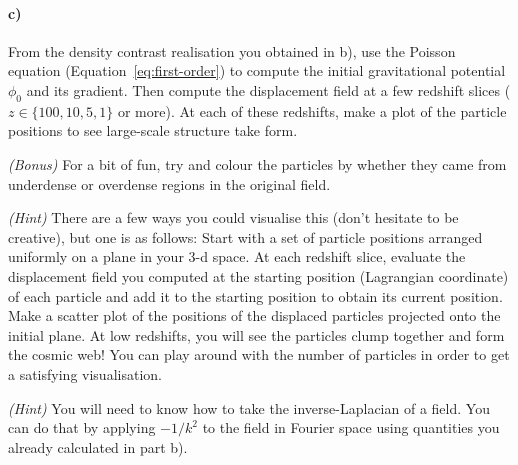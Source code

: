\documentclass[12pt]{article}
\begin{document}
\paragraph{c)} From the density contrast realisation you obtained in b), use the
Poisson equation (Equation~\ref{eq:first-order}) to compute the initial
gravitational potential $\phi_0$ and its gradient. Then compute the
displacement field at a few redshift slices ($z \in \{100, 10, 5, 1\}$ or more).
At each of these redshifts, make a plot of the particle positions to see
large-scale structure take form.

\emph{(Bonus)} For a bit of fun, try and colour the particles by whether they came from underdense or overdense regions in the original field.

\emph{(Hint)} There are a few ways you could visualise this (don't hesitate to
be creative), but one is as follows: Start with a set of particle positions
arranged uniformly on a plane in your 3-d space. At each redshift slice,
evaluate the displacement field you computed at the starting position
(Lagrangian coordinate) of each particle and add it to the starting position to
obtain its current position. Make a scatter plot of the positions of the
displaced particles projected onto the initial plane. At low redshifts, you will
see the particles clump together and form the cosmic web! You can play around
with the number of particles in order to get a satisfying visualisation.

\emph{(Hint)} You will need to know how to take the inverse-Laplacian of a field. You can do that by applying $-1 / k^2$ to the field in Fourier space using quantities you already calculated in part b).

\end{document}
